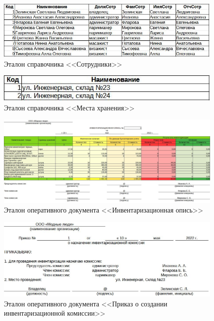 \documentclass[12pt, a4paper, simple]{eskdtext}
\begin{document}
    \begin{figure}[!h]
        \centering
        \includegraphics[]
            {_docs/СП_Сотр_эталон.jpg}
        \caption{Эталон справочника <<Сотрудники>>}
        \label{fig:CP_Sotrudniki_etalon}
    \end{figure}

    \begin{figure}[!h]
        \centering
        \includegraphics[]
            {_docs/СП_МестаХран_эталон.jpg}
        \caption{Эталон справочника <<Места хранения>>}
        \label{fig:CP_MestaXran_etalon}
    \end{figure}

    \begin{figure}[!h]
        \centering
        \includegraphics[width=18cm]
            {_docs/ОП_ИнвенОпис_эталон.jpg}
        \caption{Эталон оперативного документа <<Инвентаризационная опись>>}
        \label{fig:OP_InvenOpis_etalon}
    \end{figure}

    \begin{figure}[!h]
        \centering
        \includegraphics[width=18cm]
            {_docs/ОП_ПриказСоздКомИнвент_эталон.jpg}
        \caption{Эталон оперативного документа <<Приказ о создании инвентаризационной комиссии>>}
        \label{fig:OP_PrikazSozdKomInvest_etalon}
    \end{figure}
\end{document}
